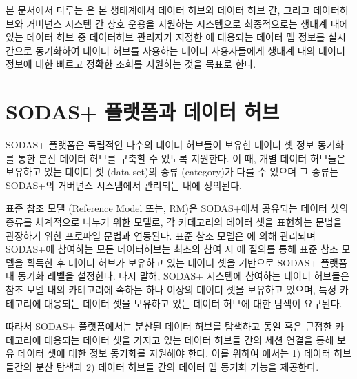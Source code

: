 \documentclass[a4paper,10pt,english]{sphinxmanual}
\begin{document}
\sphinxAtStartPar
본 문서에서 다루는  은 본 생태계에서 데이터 허브와 데이터 허브 간, 그리고 데이터허브와 거버넌스 시스템 간 상호 운용을 지원하는 시스템으로
최종적으로는 생태계 내에 있는 데이터 허브 중 데이터허브 관리자가 지정한  에 대응되는
데이터 맵 정보를 실시간으로 동기화하여 데이터 허브를 사용하는 데이터 사용자들에게 생태계 내의 데이터 정보에 대한 빠르고 정확한 조회를 지원하는 것을 목표로 한다.


\begin{DUlineblock}{0em}
\item[] 
\item[] 
\end{DUlineblock}


\section{SODAS+ 플랫폼과 데이터 허브}
\label{\detokenize{intro_sodas:id1}}
\sphinxAtStartPar
SODAS+ 플랫폼은 독립적인 다수의 데이터 허브들이 보유한 데이터 셋 정보 동기화를 통한 분산 데이터 허브를 구축할 수 있도록 지원한다.
이 때, 개별 데이터 허브들은 보유하고 있는 데이터 셋 (data set)의 종류 (category)가 다를 수 있으며 그 종류는 SODAS+의 거버넌스 시스템에서 관리되는  내에 정의된다.

\sphinxAtStartPar
표준 참조 모델 (Reference Model 또는, RM)은 SODAS+에서 공유되는 데이터 셋의 종류를 체계적으로 나누기 위한 모델로,
각 카테고리의 데이터 셋을 표현하는 문법을 관장하기 위한 프로파일 문법과 연동된다.
표준 참조 모델은  에 의해 관리되며 SODAS+에 참여하는 모든 데이터허브는 최초의 참여 시  에 질의를 통해 표준 참조 모델을 획득한 후
데이터 허브가 보유하고 있는 데이터 셋을 기반으로 SODAS+ 플랫폼 내 동기화 레벨을 설정한다.
다시 말해, SODAS+ 시스템에 참여하는 데이터 허브들은 참조 모델 내의 카테고리에 속하는 하나 이상의 데이터 셋을 보유하고 있으며, 특정 카테고리에 대응되는 데이터 셋을 보유하고 있는 데이터 허브에 대한 탐색이 요구된다.

\sphinxAtStartPar
따라서 SODAS+ 플랫폼에서는 분산된 데이터 허브를 탐색하고 동일 혹은 근접한 카테고리에 대응되는 데이터 셋을 가지고 있는 데이터 허브들 간의 세션 연결을 통해 보유 데이터 셋에 대한 정보 동기화를 지원해야 한다.
이를 위하여  에서는 1) 데이터 허브들간의 분산 탐색과 2) 데이터 허브들 간의 데이터 맵 동기화 기능을 제공한다.
\end{document}
